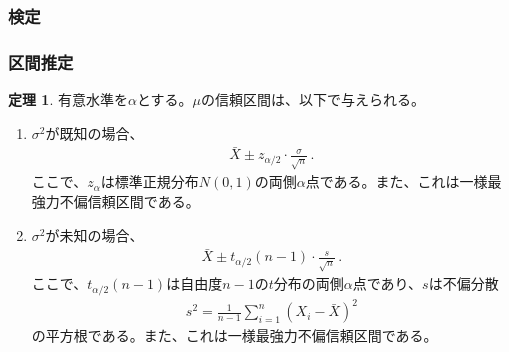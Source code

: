 \documentclass[11pt]{ltjsarticle}
\theoremstyle{definition}
\newtheorem{theorem}{定理}[section]
\begin{document}
\subsubsection{検定}



\subsubsection{区間推定}
\begin{theorem}
    有意水準を$\alpha$とする。$\mu$の信頼区間は、以下で与えられる。
    \begin{enumerate}[(1)]
        \item $\sigma^2$が既知の場合、
        \begin{align}
            \bar{X} \pm z_{\alpha/2}\cdot\frac{\sigma}{\sqrt{n}}\,.
        \end{align}
        ここで、$z_{\alpha}$は標準正規分布$N(0, 1)$の両側$\alpha$点である。また、これは一様最強力不偏信頼区間である。

        \item $\sigma^2$が未知の場合、
        \begin{align}
            \bar{X} \pm t_{\alpha/2}(n-1)\cdot\frac{s}{\sqrt{n}}\,.
        \end{align}
        ここで、$t_{\alpha/2}(n-1)$は自由度$n-1$の$t$分布の両側$\alpha$点であり、$s$は不偏分散
        \begin{align}\label{sqrtubs}
            s^2 = \frac{1}{n-1}\sum_{i=1}^n(X_i-\bar{X})^2
        \end{align}
        の平方根である。また、これは一様最強力不偏信頼区間である。
    \end{enumerate}
\end{theorem}
\end{document}
